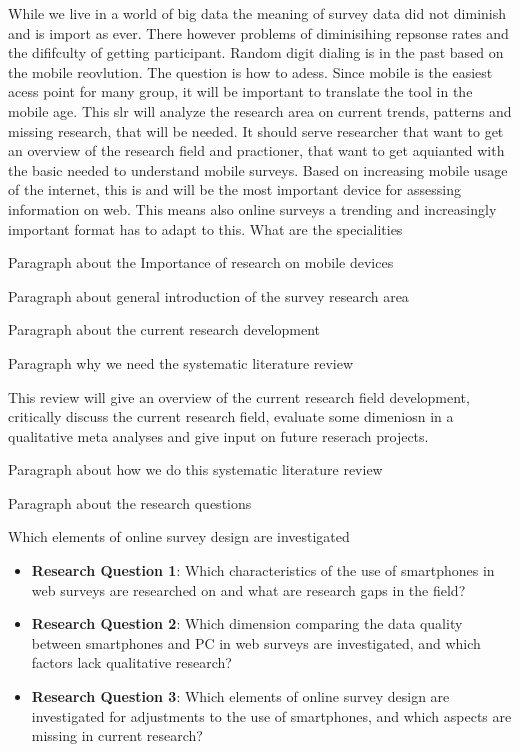 While we live in a world of big data the meaning of survey data did not diminish and is import as ever. There however problems of diminisihing repsonse rates and the dififculty of getting participant. Random digit dialing is in the past based on the mobile reovlution. The question is how to adess. Since mobile is the easiest acess point for many group, it will be important to translate the tool in the mobile age. This slr will analyze the research area on current trends, patterns and missing research, that will be needed. It should serve researcher that want to get an overview of the research field and practioner, that want to get aquianted with the basic needed to understand mobile surveys. 
Based on increasing mobile usage of the internet, this is and will be the most important device for assessing information on web. This means also online surveys a trending and increasingly important format has to adapt to this. What are the specialities

Paragraph about the Importance of research on mobile devices

Paragraph about general introduction of the survey research area

Paragraph about the current research development

Paragraph why we need the systematic literature review

This review will give an overview of the current research field development, critically discuss the current research field, evaluate some dimeniosn in a qualitative meta analyses and give input on future reserach projects.

Paragraph about how we do this systematic literature review

Paragraph about the research questions


Which elements of online survey design are investigated 

\begin{itemize}
   \item \textbf{Research Question 1}: Which characteristics of the use of smartphones in web surveys are researched on and what are research gaps in the field? 
   \item \textbf{Research Question 2}: Which dimension comparing the data quality between smartphones and PC in web surveys are investigated, and which factors lack qualitative research?
   \item \textbf{Research Question 3}: Which elements of online survey design are investigated for adjustments to the use of smartphones, and which aspects are missing in current research?
\end{itemize}

